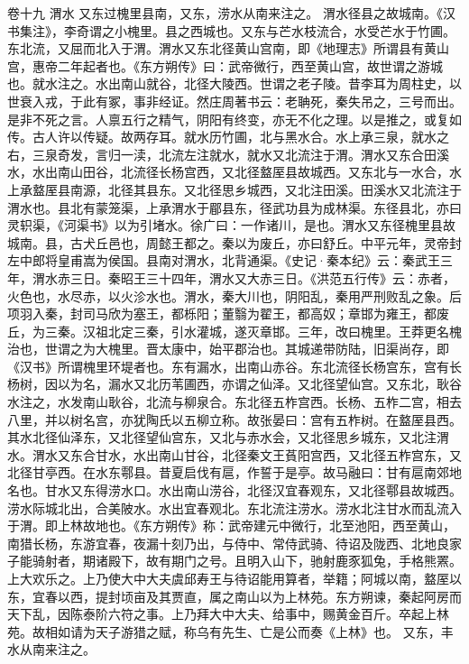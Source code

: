 \documentclass[12pt,UTF8]{ctexbook}
\begin{document}
卷十九  渭水 
又东过槐里县南，又东，涝水从南来注之。
渭水径县之故城南。《汉书集注》，李奇谓之小槐里。县之西城也。又东与芒水枝流合，水受芒水于竹圃。东北流，又屈而北入于渭。渭水又东北径黄山宫南，即《地理志》所谓县有黄山宫，惠帝二年起者也。《东方朔传》曰：武帝微行，西至黄山宫，故世谓之游城也。就水注之。水出南山就谷，北径大陵西。世谓之老子陵。昔李耳为周柱史，以世衰入戎，于此有冢，事非经证。然庄周著书云：老聃死，秦失吊之，三号而出。是非不死之言。人禀五行之精气，阴阳有终变，亦无不化之理。以是推之，或复如传。古人许以传疑。故两存耳。就水历竹圃，北与黑水合。水上承三泉，就水之右，三泉奇发，言归一渎，北流左注就水，就水又北流注于渭。渭水又东合田溪水，水出南山田谷，北流径长杨宫西，又北径盩厔县故城西。又东北与一水合，水上承盩厔县南源，北径其县东。又北径思乡城西，又北注田溪。田溪水又北流注于渭水也。县北有蒙笼渠，上承渭水于郿县东，径武功县为成林渠。东径县北，亦曰灵轵渠，《河渠书》以为引堵水。徐广曰：一作诸川，是也。渭水又东径槐里县故城南。县，古犬丘邑也，周懿王都之。秦以为废丘，亦曰舒丘。中平元年，灵帝封左中郎将皇甫嵩为侯国。县南对渭水，北背通渠。《史记·秦本纪》云：秦武王三年，渭水赤三日。秦昭王三十四年，渭水又大赤三日。《洪范五行传》云：赤者，火色也，水尽赤，以火沴水也。渭水，秦大川也，阴阳乱，秦用严刑败乱之象。后项羽入秦，封司马欣为塞王，都栎阳；董翳为翟王，都高奴；章邯为雍王，都废丘，为三秦。汉祖北定三秦，引水灌城，遂灭章邯。三年，改曰槐里。王莽更名槐治也，世谓之为大槐里。晋太康中，始平郡治也。其城递带防陆，旧渠尚存，即《汉书》所谓槐里环堤者也。东有漏水，出南山赤谷。东北流径长杨宫东，宫有长杨树，因以为名，漏水又北历苇圃西，亦谓之仙泽。又北径望仙宫。又东北，耿谷水注之，水发南山耿谷，北流与柳泉合。东北径五柞宫西。长杨、五柞二宫，相去八里，并以树名宫，亦犹陶氏以五柳立称。故张晏曰：宫有五柞树。在盩厔县西。其水北径仙泽东，又北径望仙宫东，又北与赤水会，又北径思乡城东，又北注渭水。渭水又东合甘水，水出南山甘谷，北径秦文王萯阳宫西，又北径五柞宫东，又北径甘亭西。在水东鄠县。昔夏启伐有扈，作誓于是亭。故马融曰：甘有扈南郊地名也。甘水又东得涝水口。水出南山涝谷，北径汉宜春观东，又北径鄠县故城西。涝水际城北出，合美陂水。水出宜春观北。东北流注涝水。涝水北注甘水而乱流入于渭。即上林故地也。《东方朔传》称：武帝建元中微行，北至池阳，西至黄山，南猎长杨，东游宜春，夜漏十刻乃出，与侍中、常侍武骑、待诏及陇西、北地良家子能骑射者，期诸殿下，故有期门之号。且明入山下，驰射鹿豕狐兔，手格熊罴。上大欢乐之。上乃使大中大夫虞邱寿王与待诏能用算者，举籍；阿城以南，盩厔以东，宜春以西，提封顷亩及其贾直，属之南山以为上林苑。东方朔谏，秦起阿房而天下乱，因陈泰阶六符之事。上乃拜大中大夫、给事中，赐黄金百斤。卒起上林苑。故相如请为天子游猎之赋，称乌有先生、亡是公而奏《上林》也。
又东，丰水从南来注之。
\end{document}
